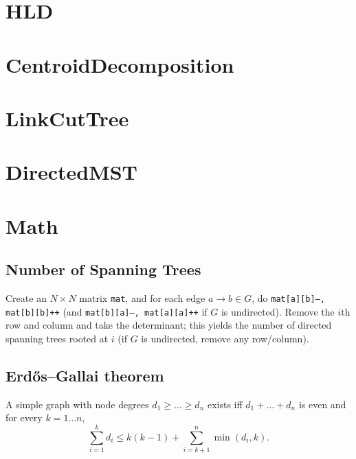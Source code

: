 \section{HLD}
\section{CentroidDecomposition}
\section{LinkCutTree}
\section{DirectedMST}

\section{Math}
	\subsection{Number of Spanning Trees}
		Create an $N\times N$ matrix \texttt{mat}, and for each edge $a \rightarrow b \in G$, do
		\texttt{mat[a][b]--, mat[b][b]++} (and \texttt{mat[b][a]--, mat[a][a]++} if $G$ is undirected).
		Remove the $i$th row and column and take the determinant; this yields the number of directed spanning trees rooted at $i$
		(if $G$ is undirected, remove any row/column).

	\subsection{Erdős–Gallai theorem}
		A simple graph with node degrees $d_1 \ge \dots \ge d_n$ exists iff $d_1 + \dots + d_n$ is even and for every $k = 1\dots n$,
		\[ \sum _{i=1}^{k}d_{i}\leq k(k-1)+\sum _{i=k+1}^{n}\min(d_{i},k). \]
